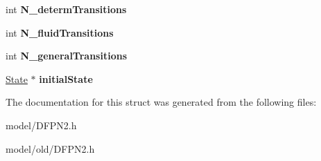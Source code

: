 \begin{DoxyCompactItemize}
\item 
\hypertarget{structModel_a88fb0421b5ec3b35e43d6230896b0a6f}{int {\bfseries N\-\_\-determ\-Transitions}}\label{structModel_a88fb0421b5ec3b35e43d6230896b0a6f}

\item 
\hypertarget{structModel_af930dfc6a5504ff70c34f813d95a5e82}{int {\bfseries N\-\_\-fluid\-Transitions}}\label{structModel_af930dfc6a5504ff70c34f813d95a5e82}

\item 
\hypertarget{structModel_a59d40eb8f2d1aa6afb6f46cd83d963af}{int {\bfseries N\-\_\-general\-Transitions}}\label{structModel_a59d40eb8f2d1aa6afb6f46cd83d963af}

\item 
\hypertarget{structModel_a84ea02c68790d278f5d7268fa0a7d945}{\hyperlink{structState__tag}{State} $\ast$ {\bfseries initial\-State}}\label{structModel_a84ea02c68790d278f5d7268fa0a7d945}

\end{DoxyCompactItemize}


The documentation for this struct was generated from the following files\-:\begin{DoxyCompactItemize}
\item 
model/D\-F\-P\-N2.\-h\item 
model/old/D\-F\-P\-N2.\-h\end{DoxyCompactItemize}
